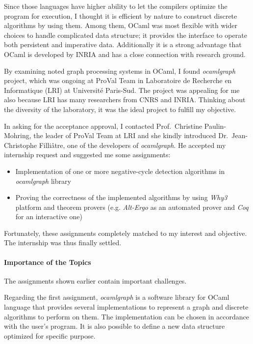 \documentclass[a4paper,10.5pt]{article}
\begin{document}
Since those languages have higher ability to let the compilers
optimize the program for execution, I thought it is efficient by
nature to construct discrete algorithms by using them. Among them,
OCaml was most flexible with wider choices to handle complicated data
structure; it provides the interface to operate both persistent and
imperative data. Additionally it is a strong advantage that OCaml is
developed by INRIA and has a close connection with research ground.

By examining noted graph processing systems in OCaml, I found
\emph{ocamlgraph} project, which was ongoing at ProVal Team in
Laboratoire de Recherche en Informatique (LRI) at Universit\'e
Paris-Sud. The project was appealing for me also because LRI has many
researchers from CNRS and INRIA.  Thinking about the diversity of the
laboratory, it was the ideal project to fulfill my objective.

In asking for the acceptance approval, I contacted Prof.\ Christine
Paulin-Mohring, the leader of ProVal Team at LRI and she kindly
introduced Dr.\ Jean-Christophe Filli\^atre, one of the developers of
\emph{ocamlgraph}. He accepted my internship request and suggested me
some assignments:

\vspace*{-4pt}\begin{itemize}\itemsep-3pt
\item Implementation of one or more negative-cycle detection
  algorithms\cite{cg99negcycle} in \emph{ocamlgraph} library
\item Proving the correctness of the implemented algorithms by using
  \emph{Why3} platform and theorem provers (e.g. \emph{Alt-Ergo} as an
  automated prover and \emph{Coq} for an interactive one)
\end{itemize}\vspace*{-4pt}

Fortunately, these assignments completely matched to my interest and
objective. The internship was thus finally settled.

\paragraph{Importance of the Topics}

The assignments shown earlier contain important challenges.

Regarding the first assignment, \emph{ocamlgraph} \cite{conchon07tfp}
is a software library for OCaml language that provides several
implementations to represent a graph and discrete algorithms to
perform on them. The implementation can be chosen in accordance with
the user's program. It is also possible to define a new data structure
optimized for specific purpose.
\end{document}
